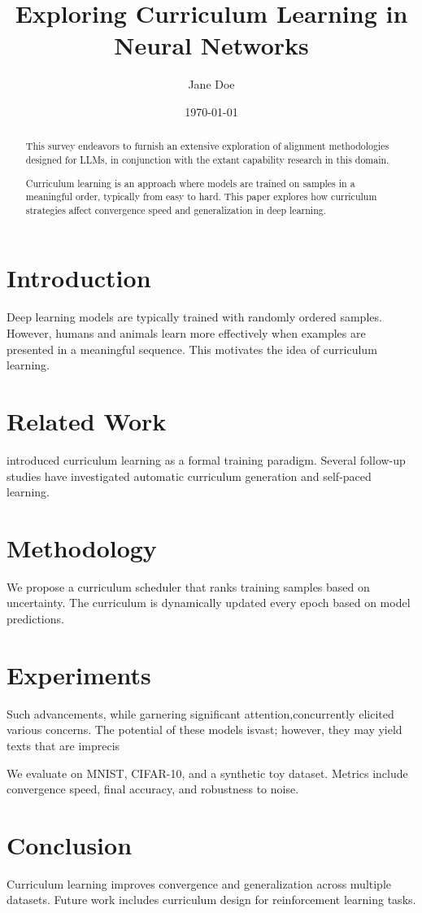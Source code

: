 \documentclass{article}
\title{Exploring Curriculum Learning in Neural Networks}
\author{Jane Doe}
\date{\today}
\begin{document}
\maketitle

\begin{abstract}
This survey endeavors to furnish an extensive exploration of alignment methodologies designed for LLMs, in conjunction with the extant capability research in this domain.

Curriculum learning is an approach where models are trained on samples in a meaningful order, typically from easy to hard. This paper explores how curriculum strategies affect convergence speed and generalization in deep learning.
\end{abstract}
 
\section{Introduction}

Deep learning models are typically trained with randomly ordered samples. However, humans and animals learn more effectively when examples are presented in a meaningful sequence. This motivates the idea of curriculum learning.

\section{Related Work}

\cite{bengio2009curriculum} introduced curriculum learning as a formal training paradigm. Several follow-up studies have investigated automatic curriculum generation and self-paced learning.

\section{Methodology}

We propose a curriculum scheduler that ranks training samples based on uncertainty. The curriculum is dynamically updated every epoch based on model predictions.

\section{Experiments}


Such advancements, while garnering significant attention,\nhave concurrently elicited various concerns. The potential of these models is\nundeniably vast; however, they may yield texts that are imprecis

We evaluate on MNIST, CIFAR-10, and a synthetic toy dataset. Metrics include convergence speed, final accuracy, and robustness to noise.

\section{Conclusion}

Curriculum learning improves convergence and generalization across multiple datasets. Future work includes curriculum design for reinforcement learning tasks.



\end{document}
